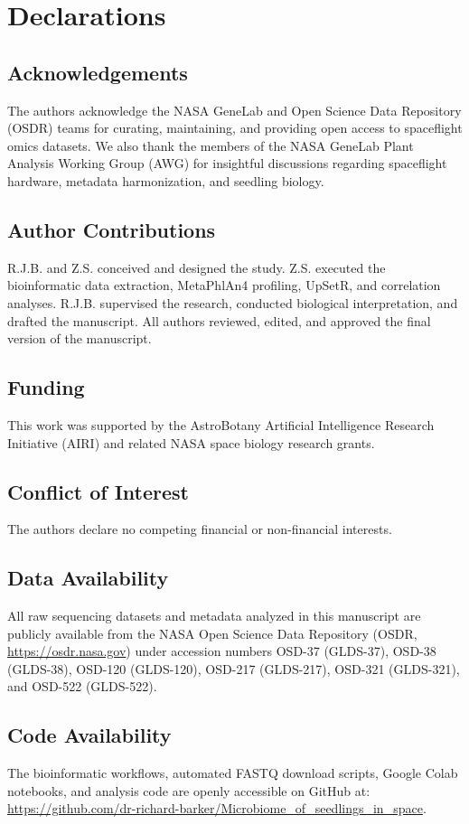 \section{Declarations}
\label{sec:declarations}

\subsection{Acknowledgements}
The authors acknowledge the NASA GeneLab and Open Science Data Repository (OSDR) teams for curating, maintaining, and providing open access to spaceflight omics datasets. We also thank the members of the NASA GeneLab Plant Analysis Working Group (AWG) for insightful discussions regarding spaceflight hardware, metadata harmonization, and seedling biology.

\subsection{Author Contributions}
R.J.B. and Z.S. conceived and designed the study. Z.S. executed the bioinformatic data extraction, MetaPhlAn4 profiling, UpSetR, and correlation analyses. R.J.B. supervised the research, conducted biological interpretation, and drafted the manuscript. All authors reviewed, edited, and approved the final version of the manuscript.

\subsection{Funding}
This work was supported by the AstroBotany Artificial Intelligence Research Initiative (AIRI) and related NASA space biology research grants.

\subsection{Conflict of Interest}
The authors declare no competing financial or non-financial interests.

\subsection{Data Availability}
All raw sequencing datasets and metadata analyzed in this manuscript are publicly available from the NASA Open Science Data Repository (OSDR, \url{https://osdr.nasa.gov}) under accession numbers OSD-37 (GLDS-37), OSD-38 (GLDS-38), OSD-120 (GLDS-120), OSD-217 (GLDS-217), OSD-321 (GLDS-321), and OSD-522 (GLDS-522).

\subsection{Code Availability}
The bioinformatic workflows, automated FASTQ download scripts, Google Colab notebooks, and analysis code are openly accessible on GitHub at: \\
\url{https://github.com/dr-richard-barker/Microbiome_of_seedlings_in_space}.
